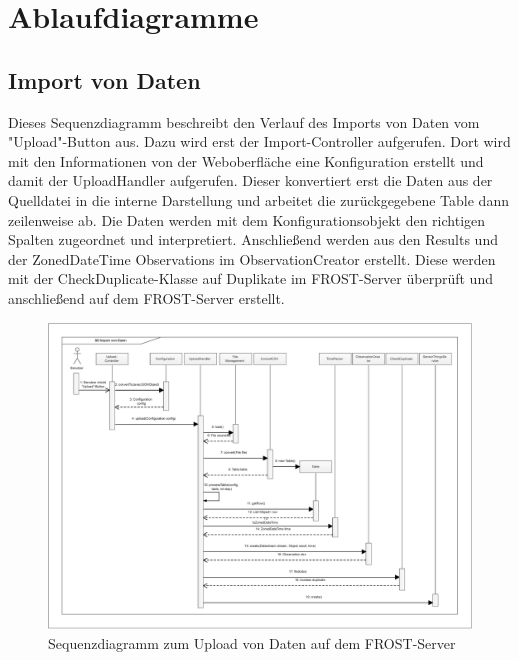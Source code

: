 \section{Ablaufdiagramme}

\subsection{Import von Daten}

Dieses Sequenzdiagramm beschreibt den Verlauf des Imports von Daten vom "Upload"-Button aus.
Dazu wird erst der Import-Controller aufgerufen.
Dort wird mit den Informationen von der Weboberfläche eine Konfiguration erstellt und damit der UploadHandler aufgerufen.
Dieser konvertiert erst die Daten aus der Quelldatei in die interne Darstellung und arbeitet die zurückgegebene Table dann zeilenweise ab.
Die Daten werden mit dem Konfigurationsobjekt den richtigen Spalten zugeordnet und interpretiert.
Anschließend werden aus den Results und der ZonedDateTime Observations im ObservationCreator erstellt.
Diese werden mit der CheckDuplicate-Klasse auf Duplikate im FROST-Server überprüft und anschließend auf dem FROST-Server erstellt.

\begin{figure}[htbp]
\centering
\includegraphics[scale=0.44]{uml/SD_upload.eps}
\caption{Sequenzdiagramm zum Upload von Daten auf dem FROST-Server}
\end{figure}

\clearpage
